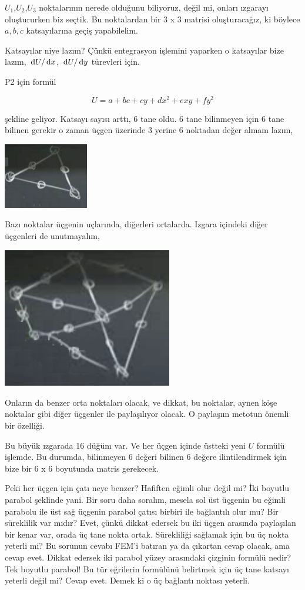 \documentclass[12pt,fleqn]{article}\usepackage{../../common}
\begin{document}
$U_1$,$U_2$,$U_3$ noktalarının nerede olduğunu biliyoruz, değil mi, onları
ızgarayı oluştururken biz seçtik. Bu noktalardan bir 3 x 3 matrisi
oluşturacağız, ki böylece $a,b,c$ katsayılarına geçiş yapabilelim.

Katsayılar niye lazım? Çünkü entegrasyon işlemini yaparken o katsayılar bize
lazım, $\,\mathrm{d} U / \,\mathrm{d} x$, $\,\mathrm{d} U / \,\mathrm{d} y$ türevleri için. 

P2 için formül

$$
U = a + bc + cy + dx^2 + exy + fy^2
$$

şekline geliyor. Katsayı sayısı arttı, 6 tane oldu. 6 tane bilinmeyen için 6
tane bilinen gerekir o zaman üçgen üzerinde 3 yerine 6 noktadan değer almam
lazım, 

\includegraphics[width=10em]{compscieng_1_27_05.png}

Bazı noktalar üçgenin uçlarında, diğerleri ortalarda. Izgara içindeki diğer
üçgenleri de unutmayalım, 

\includegraphics[width=20em]{compscieng_1_27_06.png}

Onların da benzer orta noktaları olacak, ve dikkat, bu noktalar, aynen köşe
noktalar gibi diğer üçgenler ile paylaşılıyor olacak. O paylaşım metotun
önemli bir özelliği.

Bu büyük ızgarada 16 düğüm var. Ve her üçgen içinde üstteki yeni $U$ formülü
işlemde. Bu durumda, bilinmeyen 6 değeri bilinen 6 değere ilintilendirmek için
bize bir 6 x 6 boyutunda matris gerekecek.

Peki her üçgen için çatı neye benzer?  Hafiften eğimli olur değil mi? İki
boyutlu parabol şeklinde yani. Bir soru daha soralım, mesela sol üst
üçgenin bu eğimli parabolu ile üst sağ üçgenin parabol çatısı birbiri ile
bağlantılı olur mu? Bir süreklilik var mıdır? Evet, çünkü dikkat edersek
bu iki üçgen arasında paylaşılan bir kenar var, orada üç tane nokta ortak.
Sürekliliği sağlamak için bu üç nokta yeterli mi? Bu sorunun cevabı FEM'i
batıran ya da çıkartan cevap olacak, ama cevap evet. Dikkat edersek
iki parabol yüzey arasındaki çizginin formülü nedir? Tek boyutlu parabol!
Bu tür eğrilerin formülünü belirtmek için üç tane katsayı yeterli değil mi?
Cevap evet. Demek ki o üç bağlantı noktası yeterli.
\end{document}
